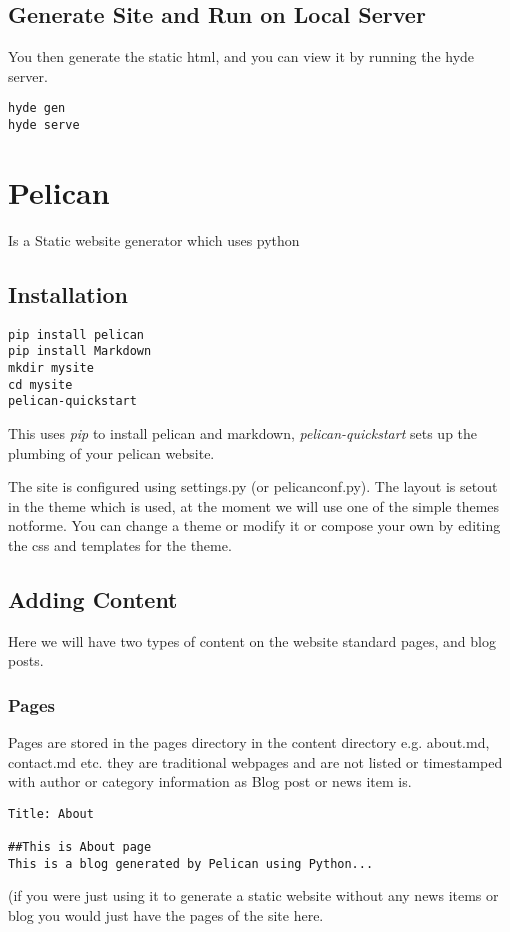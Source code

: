 \documentclass[12pt]{article}			%
\begin{document}
\subsection{Generate Site and Run on Local Server}
You then generate the static html, and you can view it by running the hyde server.
\begin{verbatim}
hyde gen
hyde serve
\end{verbatim}

\newpage
\section{Pelican}
Is a Static website generator which uses python
\subsection{Installation}
\begin{verbatim}
pip install pelican
pip install Markdown
mkdir mysite
cd mysite
pelican-quickstart
\end{verbatim}
This uses \textit{pip} to install pelican and markdown, \textit{pelican-quickstart} sets up the plumbing of your pelican website.\par
The site is configured using settings.py (or pelicanconf.py).
The layout is setout in the theme which is used, at the moment we will use one of the simple themes notforme. You can change a theme or modify it or compose your own by editing the css and templates for the theme.
\subsection{Adding Content}
Here we will have two types of content on the website standard pages, and blog posts.
\subsubsection{Pages}
Pages are stored in the pages directory in the content directory e.g. about.md, contact.md etc. they are traditional webpages and are not listed or timestamped with author or category information as Blog post or news item is.

\begin{verbatim}
Title: About

##This is About page
This is a blog generated by Pelican using Python...
\end{verbatim}
(if you were just using it to generate a static website without any news items or blog you would just have the pages of the site here.
\end{document}
